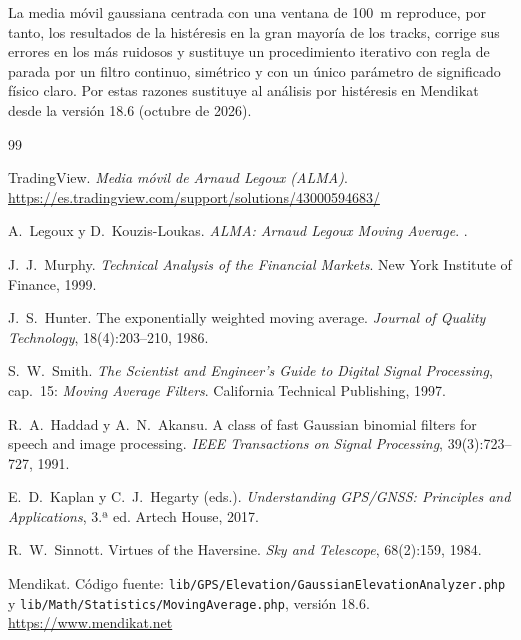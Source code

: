 \documentclass[11pt,a4paper]{article}
\begin{document}
La media móvil gaussiana centrada con una ventana de 100~m reproduce, por
tanto, los resultados de la histéresis en la gran mayoría de los tracks,
corrige sus errores en los más ruidosos y sustituye un procedimiento iterativo
con regla de parada por un filtro continuo, simétrico y con un único parámetro
de significado físico claro. Por estas razones sustituye al análisis por
histéresis en Mendikat desde la versión 18.6 (octubre de 2026).

\begin{thebibliography}{99}

TradingView.
\newblock \emph{Media móvil de Arnaud Legoux (ALMA)}.
\newblock \url{https://es.tradingview.com/support/solutions/43000594683/}

A.~Legoux y D.~Kouzis-Loukas.
\newblock \emph{ALMA: Arnaud Legoux Moving Average}.
.

J.~J.~Murphy.
\newblock \emph{Technical Analysis of the Financial Markets}.
\newblock New York Institute of Finance, 1999.

J.~S.~Hunter.
\newblock The exponentially weighted moving average.
\newblock \emph{Journal of Quality Technology}, 18(4):203--210, 1986.

S.~W.~Smith.
\newblock \emph{The Scientist and Engineer's Guide to Digital Signal
          Processing}, cap.~15: \emph{Moving Average Filters}.
\newblock California Technical Publishing, 1997.

R.~A.~Haddad y A.~N.~Akansu.
\newblock A class of fast Gaussian binomial filters for speech and image
          processing.
\newblock \emph{IEEE Transactions on Signal Processing}, 39(3):723--727, 1991.

E.~D.~Kaplan y C.~J.~Hegarty (eds.).
\newblock \emph{Understanding GPS/GNSS: Principles and Applications}, 3.ª ed.
\newblock Artech House, 2017.

R.~W.~Sinnott.
\newblock Virtues of the Haversine.
\newblock \emph{Sky and Telescope}, 68(2):159, 1984.

Mendikat.
\newblock Código fuente: \texttt{lib/GPS/Elevation/GaussianElevationAnalyzer.php}
          y \texttt{lib/Math/Statistics/MovingAverage.php}, versión 18.6.
\newblock \url{https://www.mendikat.net}

\end{thebibliography}
\end{document}
